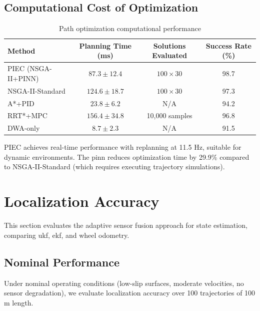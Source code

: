 
\subsection{Computational Cost of Optimization}

\begin{table}[htbp]
\centering
\caption{Path optimization computational performance}
\label{tab:optimization_time}
\begin{tabular}{lccc}
\toprule
\textbf{Method} & \textbf{Planning Time (ms)} & \textbf{Solutions Evaluated} & \textbf{Success Rate (\%)} \\
\midrule
PIEC (NSGA-II+PINN) & $87.3 \pm 12.4$ & $100 \times 30$ & 98.7 \\
NSGA-II-Standard & $124.6 \pm 18.7$ & $100 \times 30$ & 97.3 \\
A*+PID & $23.8 \pm 6.2$ & N/A & 94.2 \\
RRT*+MPC & $156.4 \pm 34.8$ & 10,000 samples & 96.8 \\
DWA-only & $8.7 \pm 2.3$ & N/A & 91.5 \\
\bottomrule
\end{tabular}
\end{table}

PIEC achieves real-time performance with replanning at 11.5 Hz, suitable for dynamic environments. The \acrshort{pinn} reduces optimization time by 29.9\% compared to NSGA-II-Standard (which requires executing trajectory simulations).

\section{Localization Accuracy}
\label{sec:localization_accuracy}

This section evaluates the adaptive sensor fusion approach for state estimation, comparing \acrshort{ukf}, \acrshort{ekf}, and wheel odometry.

\subsection{Nominal Performance}

Under nominal operating conditions (low-slip surfaces, moderate velocities, no sensor degradation), we evaluate localization accuracy over 100 trajectories of 100 m length.

